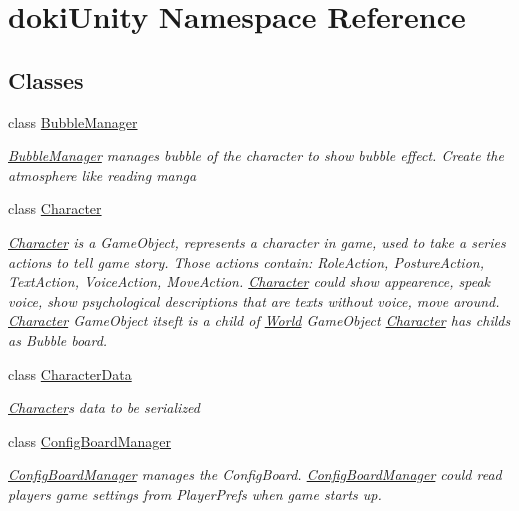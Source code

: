 \hypertarget{namespacedoki_unity}{}\section{doki\+Unity Namespace Reference}
\label{namespacedoki_unity}
\subsection*{Classes}
\begin{DoxyCompactItemize}
\item 
class \hyperlink{classdoki_unity_1_1_bubble_manager}{Bubble\+Manager}
\begin{DoxyCompactList}\small\item\em \hyperlink{classdoki_unity_1_1_bubble_manager}{Bubble\+Manager} manages bubble of the character to show bubble effect. Create the atmosphere like reading manga \end{DoxyCompactList}\item 
class \hyperlink{classdoki_unity_1_1_character}{Character}
\begin{DoxyCompactList}\small\item\em \hyperlink{classdoki_unity_1_1_character}{Character} is a Game\+Object, represents a character in game, used to take a series actions to tell game story. Those actions contain\+: Role\+Action, Posture\+Action, Text\+Action, Voice\+Action, Move\+Action. \hyperlink{classdoki_unity_1_1_character}{Character} could show appearence, speak voice, show psychological descriptions that are texts without voice, move around. \hyperlink{classdoki_unity_1_1_character}{Character} Game\+Object itseft is a child of \hyperlink{classdoki_unity_1_1_world}{World} Game\+Object \hyperlink{classdoki_unity_1_1_character}{Character} has childs as Bubble board. \end{DoxyCompactList}\item 
class \hyperlink{classdoki_unity_1_1_character_data}{Character\+Data}
\begin{DoxyCompactList}\small\item\em \hyperlink{classdoki_unity_1_1_character}{Character}\textquotesingle{}s data to be serialized \end{DoxyCompactList}\item 
class \hyperlink{classdoki_unity_1_1_config_board_manager}{Config\+Board\+Manager}
\begin{DoxyCompactList}\small\item\em \hyperlink{classdoki_unity_1_1_config_board_manager}{Config\+Board\+Manager} manages the Config\+Board. \hyperlink{classdoki_unity_1_1_config_board_manager}{Config\+Board\+Manager} could read player\textquotesingle{}s game settings from Player\+Prefs when game starts up. \end{DoxyCompactList}\item 

\end{DoxyCompactItemize}
